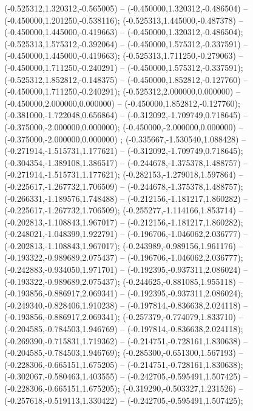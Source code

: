  (-0.525312,1.320312,-0.565005) -- (-0.450000,1.320312,-0.486504) -- (-0.450000,1.201250,-0.538116);
 (-0.525313,1.445000,-0.487378) -- (-0.450000,1.445000,-0.419663) -- (-0.450000,1.320312,-0.486504);
 (-0.525313,1.575312,-0.392064) -- (-0.450000,1.575312,-0.337591) -- (-0.450000,1.445000,-0.419663);
 (-0.525313,1.711250,-0.279063) -- (-0.450000,1.711250,-0.240291) -- (-0.450000,1.575312,-0.337591);
 (-0.525312,1.852812,-0.148375) -- (-0.450000,1.852812,-0.127760) -- (-0.450000,1.711250,-0.240291);
 (-0.525312,2.000000,0.000000) -- (-0.450000,2.000000,0.000000) -- (-0.450000,1.852812,-0.127760);
 (-0.381000,-1.722048,0.656864) -- (-0.312092,-1.709749,0.718645) -- (-0.375000,-2.000000,0.000000);
 (-0.450000,-2.000000,0.000000) -- (-0.375000,-2.000000,0.000000) ;
 (-0.335667,-1.530540,1.088428) -- (-0.271914,-1.515731,1.177621) -- (-0.312092,-1.709749,0.718645);
 (-0.304354,-1.389108,1.386517) -- (-0.244678,-1.375378,1.488757) -- (-0.271914,-1.515731,1.177621);
 (-0.282153,-1.279018,1.597864) -- (-0.225617,-1.267732,1.706509) -- (-0.244678,-1.375378,1.488757);
 (-0.266331,-1.189576,1.748488) -- (-0.212156,-1.181217,1.860282) -- (-0.225617,-1.267732,1.706509);
 (-0.255277,-1.114166,1.853714) -- (-0.202813,-1.108843,1.967017) -- (-0.212156,-1.181217,1.860282);
 (-0.248021,-1.048399,1.922791) -- (-0.196706,-1.046062,2.036777) -- (-0.202813,-1.108843,1.967017);
 (-0.243989,-0.989156,1.961176) -- (-0.193322,-0.989689,2.075437) -- (-0.196706,-1.046062,2.036777);
 (-0.242883,-0.934050,1.971701) -- (-0.192395,-0.937311,2.086024) -- (-0.193322,-0.989689,2.075437);
 (-0.244625,-0.881085,1.955118) -- (-0.193856,-0.886917,2.069341) -- (-0.192395,-0.937311,2.086024);
 (-0.249340,-0.828406,1.910238) -- (-0.197814,-0.836638,2.024118) -- (-0.193856,-0.886917,2.069341);
 (-0.257379,-0.774079,1.833710) -- (-0.204585,-0.784503,1.946769) -- (-0.197814,-0.836638,2.024118);
 (-0.269390,-0.715831,1.719362) -- (-0.214751,-0.728161,1.830638) -- (-0.204585,-0.784503,1.946769);
 (-0.285300,-0.651300,1.567193) -- (-0.228306,-0.665151,1.675205) -- (-0.214751,-0.728161,1.830638);
 (-0.302067,-0.580463,1.403555) -- (-0.242705,-0.595491,1.507425) -- (-0.228306,-0.665151,1.675205);
 (-0.319290,-0.503327,1.231526) -- (-0.257618,-0.519113,1.330422) -- (-0.242705,-0.595491,1.507425);
